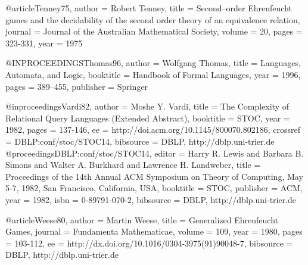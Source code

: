 \documentclass{article}
\begin{document}
@article{Tenney75,
  author    = {Robert Tenney}, 
  title     = {Second–order {Ehrenfeucht} games and the decidability of the second order theory of an equivalence relation}, 
  journal   = {Journal of the Australian Mathematical Society},
  volume    = 20,
  pages     = {323-331}, 
  year      = 1975
}

@INPROCEEDINGS{Thomas96,
    author = {Wolfgang Thomas},
    title = {Languages, Automata, and Logic},
    booktitle = {Handbook of Formal Languages},
    year = 1996,
    pages = {389--455},
    publisher = {Springer}
}

@inproceedings{Vardi82,
  author    = {Moshe Y. Vardi},
  title     = {The Complexity of Relational Query Languages (Extended Abstract)},
  booktitle = {STOC},
  year      = {1982},
  pages     = {137-146},
  ee        = {http://doi.acm.org/10.1145/800070.802186},
  crossref  = {DBLP:conf/stoc/STOC14},
  bibsource = {DBLP, http://dblp.uni-trier.de}
}
@proceedings{DBLP:conf/stoc/STOC14,
  editor    = {Harry R. Lewis and
               Barbara B. Simons and
               Walter A. Burkhard and
               Lawrence H. Landweber},
  title     = {Proceedings of the 14th Annual ACM Symposium on Theory of
               Computing, May 5-7, 1982, San Francisco, California, USA},
  booktitle = {STOC},
  publisher = {ACM},
  year      = {1982},
  isbn      = {0-89791-070-2},
  bibsource = {DBLP, http://dblp.uni-trier.de}
}

@article{Weese80,
  author    = {Martin Weese},
  title     = {Generalized {Ehrenfeucht} Games},
  journal   = {Fundamenta Mathematicae},
  volume    = {109},
  year      = {1980},
  pages     = {103-112},
  ee        = {http://dx.doi.org/10.1016/0304-3975(91)90048-7},
  bibsource = {DBLP, http://dblp.uni-trier.de}
}
 
\end{document}
